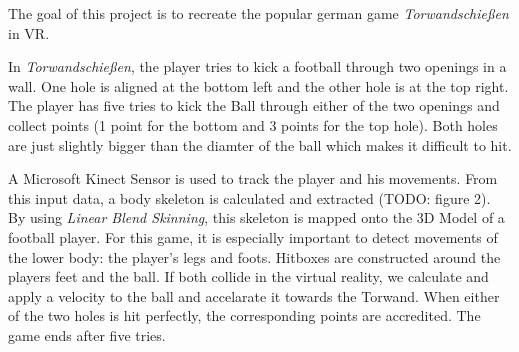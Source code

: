 \begin{multicols*}{3}

%


The goal of this project is to recreate the popular german game \textit{Torwandschießen} in VR. 


In \textit{Torwandschießen}, the player tries to kick a football through two openings in a wall.
One hole is aligned at the bottom left and the other hole is at the top right.
The player has five tries to kick the Ball through either of the two openings and collect points (1 point for the bottom and 3 points for the top hole).
Both holes are just slightly bigger than the diamter of the ball which makes it difficult to hit.



A Microsoft Kinect Sensor is used to track the player and his movements.
From this input data, a body skeleton is calculated and extracted (TODO: figure 2).
By using \textit{Linear Blend Skinning}, this skeleton is mapped onto the 3D Model of a football player.
For this game, it is especially important to detect movements of the lower body: the player's legs and foots.
Hitboxes are constructed around the players feet and the ball. 
If both collide in the virtual reality, we calculate and apply a velocity to the ball and accelarate it towards the Torwand.
When either of the two holes is hit perfectly, the corresponding points are accredited.
The game ends after five tries.

\end{multicols*}

\clearpage



%
%
%
%
%
%
%
%
%
%


